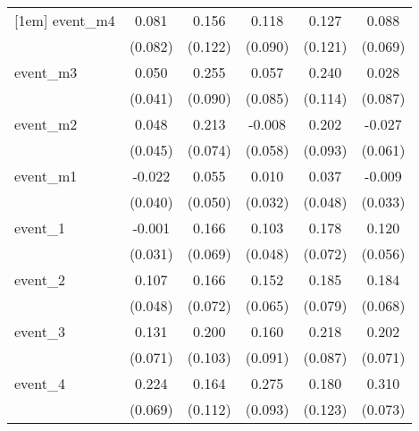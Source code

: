 {\begin{tabular}{l*{5}{c}}
[1em]
event\_m4    &       0.081         &       0.156         &       0.118         &       0.127         &       0.088         \\
            &     (0.082)         &     (0.122)         &     (0.090)         &     (0.121)         &     (0.069)         \\
[1em]
event\_m3    &       0.050         &       0.255\sym{**} &       0.057         &       0.240\sym{*}  &       0.028         \\
            &     (0.041)         &     (0.090)         &     (0.085)         &     (0.114)         &     (0.087)         \\
[1em]
event\_m2    &       0.048         &       0.213\sym{**} &      -0.008         &       0.202\sym{*}  &      -0.027         \\
            &     (0.045)         &     (0.074)         &     (0.058)         &     (0.093)         &     (0.061)         \\
[1em]
event\_m1    &      -0.022         &       0.055         &       0.010         &       0.037         &      -0.009         \\
            &     (0.040)         &     (0.050)         &     (0.032)         &     (0.048)         &     (0.033)         \\
[1em]
event\_1     &      -0.001         &       0.166\sym{*}  &       0.103\sym{*}  &       0.178\sym{*}  &       0.120\sym{*}  \\
            &     (0.031)         &     (0.069)         &     (0.048)         &     (0.072)         &     (0.056)         \\
[1em]
event\_2     &       0.107\sym{*}  &       0.166\sym{*}  &       0.152\sym{*}  &       0.185\sym{*}  &       0.184\sym{**} \\
            &     (0.048)         &     (0.072)         &     (0.065)         &     (0.079)         &     (0.068)         \\
[1em]
event\_3     &       0.131         &       0.200         &       0.160         &       0.218\sym{*}  &       0.202\sym{**} \\
            &     (0.071)         &     (0.103)         &     (0.091)         &     (0.087)         &     (0.071)         \\
[1em]
event\_4     &       0.224\sym{**} &       0.164         &       0.275\sym{**} &       0.180         &       0.310\sym{***}\\
            &     (0.069)         &     (0.112)         &     (0.093)         &     (0.123)         &     (0.073)         \\

\end{tabular}}
